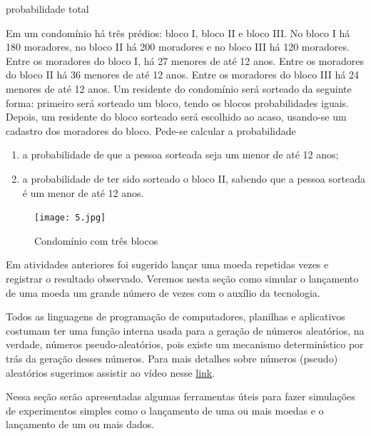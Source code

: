 \begin{task}{probabilidade total}


Em um condomínio há três prédios: bloco I, bloco II e bloco III. No bloco I há 180 moradores, no bloco II há 200 moradores e no bloco III há 120 moradores. Entre os moradores do bloco I, há 27 menores de até 12 anos. Entre os moradores do bloco II há 36 menores de até 12 anos. Entre os moradores do bloco III há 24 menores de até 12 anos. Um residente do condomínio será sorteado da seguinte forma: primeiro será sorteado um bloco, tendo os blocos probabilidades iguais.  Depois, um residente do bloco sorteado será escolhido ao acaso, usando-se um cadastro dos moradores do bloco. Pede-se calcular a probabilidade
\begin{enumerate}
\item {} 
a probabilidade de que a pessoa sorteada seja um menor de até 12 anos;

\item {} 
a probabilidade de ter sido sorteado o bloco II, sabendo que a pessoa sorteada é um menor de até 12 anos.
  
\end{enumerate}

\begin{figure}[H]
\centering

\noindent\texttt{[image: 5.jpg]}

\caption{Condomínio com três blocos}
\end{figure}

\end{task}
\know{ }

Em atividades anteriores foi sugerido lançar uma moeda repetidas vezes e registrar o resultado observado.  Veremos nesta seção como simular o lançamento de uma moeda um grande número de vezes com o auxílio da tecnologia.

Todos as linguagens de programação de computadores, planilhas e aplicativos costumam ter uma função interna usada para a geração de números aleatórios, na verdade, números pseudo-aleatórios, pois existe um mecanismo determinístico por trás da geração desses números.  Para mais detalhes sobre números (pseudo) aleatórios sugerimos assistir ao vídeo nesse  \href{https://www.youtube.com/watch?v=f4sE1r3UL4E}{link}.

Nessa seção serão apresentadas algumas ferramentas úteis para fazer simulações de experimentos simples como o lançamento de uma ou mais moedas e  o lançamento de um ou mais dados.


